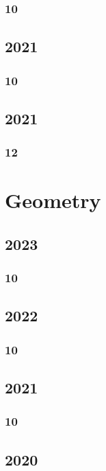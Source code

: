 \documentclass[11pt]{book}
\begin{document}
\subsection{10}

\section{2021}
\subsection{10}



\section{2021}
\subsection{12}


\chapter{Geometry}
\section{2023}
\subsection{10}


\section{2022}
\subsection{10}


\section{2021}
\subsection{10}


\section{2020}
\end{document}
